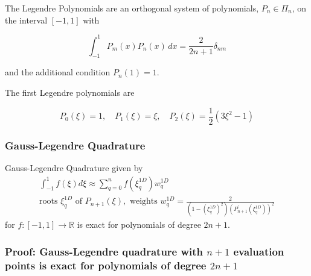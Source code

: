 The Legendre Polynomials are an orthogonal system of polynomials,
$P_n \in \Pi_n$, on the interval $[-1,1]$ with 

\begin{equation}
    \int_{-1}^{1} P_m(x) P_n(x) \, dx = \frac{2}{2n+1} \delta_{nm}
\end{equation}

and the additional condition $P_n(1) = 1$.

The first Legendre polynomials are

\begin{equation}
    P_0(\xi)=1, \quad P_1(\xi)=\xi, \quad P_2(\xi) = \frac{1}{2}\left(3 \xi^2-1\right)
\end{equation}


\subsubsection{Gauss-Legendre Quadrature}
Gauss-Legendre Quadrature given by
\begin{equation}
    \begin{gathered}
        \int_{-1}^1 f(\xi) d \xi \approx \sum_{q=0}^n f\left(\xi_q^{1 D}\right) w_q^{1 D} \\
        \text{roots } \xi_q^{1 D} \text{ of } P_{n+1}(\xi), \text{ weights } w_q^{1 D}=\frac{2}{\left(1-\left( \xi_{q}^{1 D} \right)^2\right)\left(P_{n+1}^{\prime}\left(\xi_{q}^{1 D}\right)\right)^{2}}
    \end{gathered}
\end{equation}
for $f: [-1,1] \rightarrow \mathbb{R}$ is exact for polynomials of degree $2n+1$.

\subsubsection{Proof: Gauss-Legendre quadrature with $n+1$ evaluation points is exact for polynomials of degree $2n+1$}

